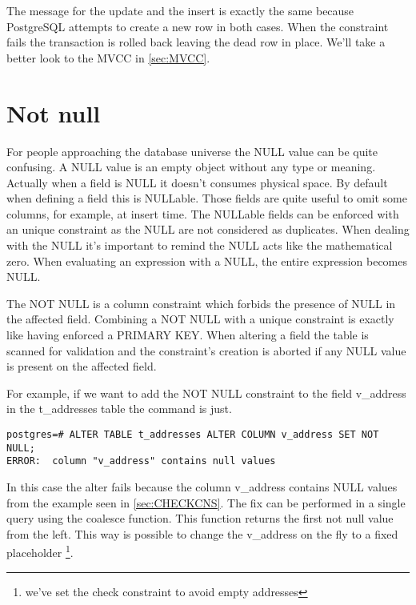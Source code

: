 The message for the update and the insert is exactly the same because PostgreSQL attempts to create 
a new row in both cases. When the constraint fails the transaction is rolled back leaving the dead 
row in place. We'll take a better look to the MVCC in \ref{sec:MVCC}.


\section{Not null}
For people approaching the database universe the NULL value can be quite confusing. A NULL value is 
an empty object without any type or meaning. Actually when a field is NULL it doesn't consumes 
physical space. By default when defining a field this is NULLable. Those fields are quite useful to 
omit some columns, for example, at insert time.\newline
The NULLable fields can be enforced with an unique constraint as the NULL are not considered as 
duplicates. When dealing with the NULL it's important to remind the NULL acts like the mathematical 
zero. When evaluating an expression with a NULL, the entire expression becomes NULL.\newline

The NOT NULL is a column constraint which forbids the presence of NULL in the affected field. 
Combining a NOT NULL with a unique constraint is exactly like having enforced a PRIMARY KEY. When 
altering a field the table is scanned for validation and the constraint's creation is aborted if 
any NULL value is present on the affected field.\newline

For example, if we want to add the NOT NULL constraint to the field v\_address in the t\_addresses 
table the command is just.

\begin{lstlisting}[style=pgsql]
postgres=# ALTER TABLE t_addresses ALTER COLUMN v_address SET NOT NULL;
ERROR:  column "v_address" contains null values

\end{lstlisting}

In this case the alter fails because the column v\_address contains NULL values from the example 
seen in \ref{sec:CHECKCNS}. The fix can be performed in a single query using the coalesce function.
This function returns the first not null value from the left. This way is possible to change the 
v\_address on the fly to a fixed placeholder \footnote{we've set the check constraint to avoid empty 
addresses}.

